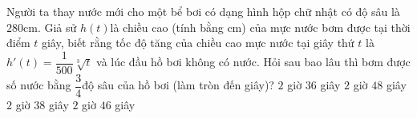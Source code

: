 \begin{ex}%
	Người ta thay nước mới cho một bể bơi có dạng hình hộp chữ nhật có độ sâu là $280$cm. Giả sử $h\left( t \right)$là chiều cao (tính bằng cm) của mực nước bơm được tại thời điểm $t$ giây, biết rằng tốc độ tăng của chiều cao mực nước tại giây thứ $t$ là ${h}'(t)=\dfrac{1}{500}\sqrt[3]{t}$ và lúc đầu hồ bơi không có nước. Hỏi sau bao lâu thì bơm được số nước bằng $\dfrac{3}{4}$độ sâu của hồ bơi (làm tròn đến giây)?
	\choice
	{$2$ giờ $36$ giây}
	{$2$ giờ $48$ giây}
	{\True $2$ giờ $38$ giây}
	{$2$ giờ $46$ giây}
\end{ex}

